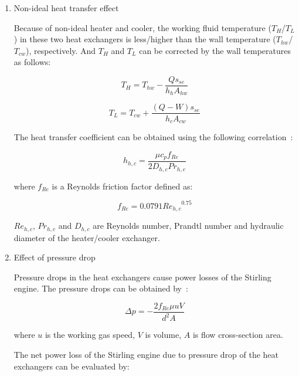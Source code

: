 \begin{enumerate}
\item Non-ideal heat transfer effect

Because of non-ideal heater and cooler, the working fluid temperature ($T_{H}$/$T_L$) in these two heat exchangers is less/higher than the wall temperature ($T_{hw}$/$T_{cw}$), respectively. And $T_{H}$ and $T_{L}$ can be corrected by the wall temperatures as follows:

\begin{equation}
	T_H = T_{hw} - \frac{Qs_{se}}{h_hA_{hw}}
	\label{eq:T_H}
\end{equation}

\begin{equation}
	T_L = T_{cw} + \frac{(Q-W)s_{se}}{h_cA_{cw}}
	\label{eq:T_L}
\end{equation}

The heat transfer coefficient can be obtained using the following correlation~\cite{Babaelahi2015}:

\begin{equation}
	h_{h,c} = \frac{\mu c_pf_{Re}}{2D_{h,c}Pr_{h,c}}
\end{equation}

where $f_{Re}$ is a Reynolds friction factor defined as:

\begin{equation}
	f_{Re} = 0.0791{Re_{h,c}}^{0.75}
\end{equation}

$Re_{h,c}$, $Pr_{h,c}$ and $D_{h,c}$ are Reynolds number, Prandtl number and hydraulic diameter of the heater/cooler exchanger.

\item Effect of pressure drop

Pressure drops in the heat exchangers cause power losses of the Stirling engine. The pressure drops can be obtained by~\cite{Urieli1984}:

\begin{equation}
	\Delta p = -\frac{2f_{Re}\mu u V}{d^2A}
\end{equation}

where $u$ is the working gas speed, $V$ is volume, $A$ is flow cross-section area.

The net power loss of the Stirling engine due to pressure drop of the heat exchangers can be evaluated by:


\end{enumerate}
